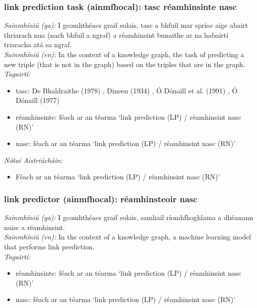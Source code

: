 \subsubsection*{link prediction task (ainmfhocal): tasc réamhinsinte nasc}
 \noindent \textit{Sainmhíniú (ga):} I gcomhthéacs graif eolais, tasc a bhfuil mar sprioc aige abairt thriarach nua (nach bhfuil a ngraf) a réamhinsint bunaithe ar na habairtí triaracha atá sa ngraf.
\\
 \noindent \textit{Sainmhíniú (en):} In the context of a knowledge graph, the task of predicting a new triple (that is not in the graph) based on the triples that are in the graph.
\\
 \noindent \textit{Tagairtí:}
\begin{itemize}
	\item tasc: De Bhaldraithe (1978) \cite{de-bhaldraithe}, Dineen (1934) \cite{dineen}, Ó Dónaill et al. (1991) \cite{focloir-beag}, Ó Dónaill (1977) \cite{odonaill}
	\item réamhinsinte: féach ar an téarma `link prediction (LP) / réamhinsint nasc (RN)'
	\item nasc: féach ar an téarma `link prediction (LP) / réamhinsint nasc (RN)'
\end{itemize}

 \noindent \textit{Nótaí Aistriúcháin:}
\begin{itemize}
	\item Féach ar an téarma `link prediction (LP) / réamhinsint nasc (RN)'
\end{itemize}


\subsubsection*{link predictor (ainmfhocal): réamhinsteoir nasc}
 \noindent \textit{Sainmhíniú (ga):} I gcomhthéacs graif eolais, samhail ríomhfhoghlama a dhéanann naisc a réamhinsint.
\\
 \noindent \textit{Sainmhíniú (en):} In the context of a knowledge graph, a machine learning model that performs link prediction.
\\
 \noindent \textit{Tagairtí:}
\begin{itemize}
	\item réamhinsinte: féach ar an téarma `link prediction (LP) / réamhinsint nasc (RN)'
	\item nasc: féach ar an téarma `link prediction (LP) / réamhinsint nasc (RN)'
\end{itemize}

